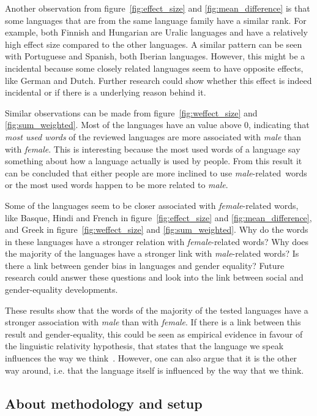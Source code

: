 Another observation from figure~\ref{fig:effect_size} and \ref{fig:mean_difference} is that
some languages that are from the same language family have
a similar rank. For example, both Finnish and Hungarian
are Uralic languages and have a
relatively high effect size compared to the other
languages. A similar pattern can be seen
with Portuguese and Spanish, both Iberian languages. However, this might be a incidental
because some closely related languages seem to have opposite effects, like German and
Dutch. Further research could show whether this effect is indeed incidental or if
there is a underlying reason behind it.

Similar observations can be made from figure~\ref{fig:weffect_size} and
\ref{fig:sum_weighted}. Most
of the languages have an value above 0, indicating that \emph{most used words} of the
reviewed languages are more associated with \emph{male} than with \emph{female}. This
is interesting because the most used words of a language say something about how a
language actually is used by people.
From this result it can be concluded that either people are more inclined to use
\mbox{\emph{male}-related words} or the most used words happen to be more related
to \mbox{\emph{male}}.

Some of the languages seem to be closer associated with \emph{female}-related words, like
Basque, Hindi and French in figure~\ref{fig:effect_size} and \ref{fig:mean_difference},
and Greek in figure~\ref{fig:weffect_size} and \ref{fig:sum_weighted}. Why do the words
in these languages have a stronger
relation with \emph{female}-related words? Why does the majority of the languages have
a stronger link with \emph{male}-related words? Is there a link between gender bias
in languages and gender equality? Future research could answer these
questions and look into the link between social and gender-equality developments.

These results show that the words of the majority of the tested languages have
a stronger association with \emph{male} than with \emph{female}. If there is a link
between this result and gender-equality, this could be seen as empirical evidence
in favour of the linguistic relativity hypothesis, that states that the
language we speak influences the way we think~\parencite{lucy_linguistic_1997}.
However, one can also argue that it is the other way around, i.e. that the language itself
is influenced by the way that we think.


\subsection{About methodology and setup}
